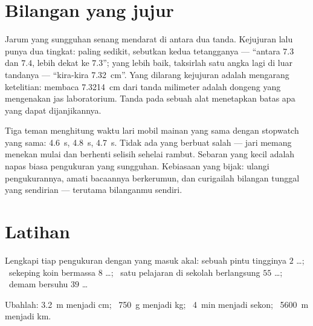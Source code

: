 \section{Bilangan yang jujur}

\begin{remark}\label{rem:g6:measurement-in-science:between}
Jarum yang sungguhan senang mendarat di antara dua tanda. Kejujuran
lalu punya dua tingkat: paling sedikit, sebutkan kedua tetangganya ---
``antara $7.3$ dan $7.4$, lebih dekat ke $7.3$''; yang lebih baik,
taksirlah satu angka lagi di luar tandanya --- ``kira-kira
\qty{7.32}{cm}''. Yang dilarang kejujuran adalah mengarang ketelitian:
membaca \qty{7.3214}{cm} dari tanda milimeter adalah dongeng yang
mengenakan jas laboratorium. Tanda pada sebuah alat menetapkan batas
apa yang dapat dijanjikannya.
\end{remark}

\begin{example}\label{ex:g6:measurement-in-science:repeat}
Tiga teman menghitung waktu lari mobil mainan yang sama dengan
stopwatch yang sama: \qty{4.6}{s}, \qty{4.8}{s}, \qty{4.7}{s}. Tidak
ada yang berbuat salah --- jari memang menekan mulai dan berhenti
selisih sehelai rambut. Sebaran yang kecil adalah napas biasa
pengukuran yang sungguhan. Kebiasaan yang bijak: ulangi pengukurannya,
amati bacaannya berkerumun, dan curigailah bilangan tunggal yang
sendirian --- terutama bilanganmu sendiri.
\end{example}

\section{Latihan}

\begin{exercise}[$\star$]\label{exo:g6:measurement-in-science:1}
Lengkapi tiap pengukuran dengan  yang masuk akal: sebuah pintu
tingginya $2$ \dots; \ sekeping koin bermassa $8$ \dots; \ satu
pelajaran di sekolah berlangsung $55$ \dots; \ demam bersuhu $39$ \dots
\end{exercise}

\begin{exercise}[$\star$]\label{exo:g6:measurement-in-science:2}
Ubahlah: \qty{3.2}{m} menjadi \unit{cm}; \ \qty{750}{g} menjadi
\unit{kg}; \ \qty{4}{min} menjadi sekon; \ \qty{5600}{m} menjadi \unit{km}.
\end{exercise}

